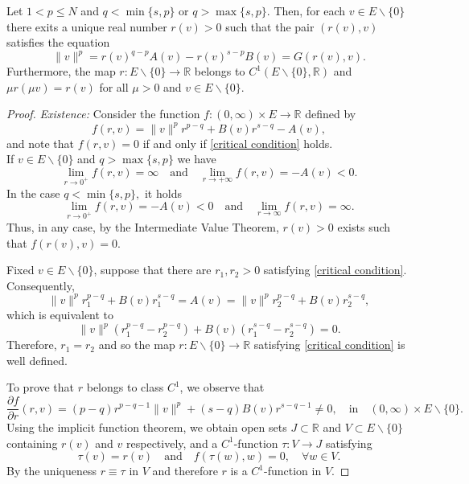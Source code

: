 \documentclass[10pt,a4paper]{amsart}
\begin{document}
\begin{lemma}\label{existence of a function r C1}Let $1<p\leq N$ and $q<\min\{s,p\}$ or $q>\max\{s,p\}$. Then, for each $v \in E\backslash\{0\}$ there exits a unique real number $r(v)>0$ such that the pair $(r(v),v)$ satisfies the equation 
  \begin{equation}\label{critical condition}
		\|v\|^p=r(v)^{q-p}A(v)-r(v)^{s-p}B(v)=G(r(v),v).
	\end{equation}
 Furthermore, the map $r:E\backslash\{0\}\rightarrow \mathds{R}$ belongs to $C^1(E\backslash\{0\},\mathds{R})$ and $\mu r(\mu v)=r(v)$ for all $\mu >0$ and $v \in E\backslash\{0\}$.
\end{lemma}

\begin{proof} {\it Existence:}
Consider the function $f:(0,\infty)\times E\rightarrow \mathds{R}$ defined by 
	\begin{equation*}
		f(r,v)=\|v\|^pr^{p-q}+B(v)r^{s-q}-A(v),
	\end{equation*} 	
and note that $f(r,v)=0$ if and only if \eqref{critical condition} holds. \\
If $v \in E\backslash\{0\}$ and $q>\max\{s,p\}$ we have
 \[
	\lim_{r\rightarrow 0^+}f(r,v)=\infty\quad \text{and}\quad \lim_{r \rightarrow +\infty}f(r,v)=-A(v)<0 .
\] 
In the case  $q<\min\{s,p\},$ it holds
 \[
\lim_{r \rightarrow 0^+}f(r,v)=-A(v)<0\quad \text{and}\quad 	\lim_{r\rightarrow \infty}f(r,v)=\infty.
	\]
Thus, in any case, by the Intermediate Value Theorem, $r(v)>0$ exists such that $f(r(v),v)=0$. 


Fixed $v \in E\backslash\{0\}$,  suppose that there are $r_1,r_2>0$ satisfying  \eqref{critical condition}. Consequently,  
\begin{equation*}
		\|v\|^pr_1^{p-q}+B(v)r_1^{s-q}=A(v)=\|v\|^pr_2^{p-q}+B(v)r_2^{s-q},
	\end{equation*}
which is equivalent to
	\begin{equation*}
		\|v\|^p(r_1^{p-q}-r_2^{p-q})+B(v)(r_1^{s-q}-r_2^{s-q})=0.
	\end{equation*}
Therefore, $r_1=r_2$ and so the map  $r:E\backslash\{0\}\rightarrow \mathds{R}$ satisfying  \eqref{critical condition} is well defined. 

 To prove that $r$ belongs to class $C^1$, we observe that  
	\begin{equation*}
		\frac{\partial f}{\partial r}(r,v)=(p-q)r^{p-q-1}\|v\|^p+(s-q)B(v)r^{s-q-1}\neq 0, \quad \text{in} \quad (0,\infty)\times E\backslash\{0\}.
	\end{equation*}
Using the implicit function theorem, 
 we obtain open sets $J \subset \mathds{R}$  and $V\subset E\backslash\{0\}$ containing $r(v)$ and $v$ respectively, and a $C^1$-function $\tau:V\rightarrow J$ satisfying 
	\[
	\tau(v)=r(v)\quad \text{and}\quad f(\tau(w),w)=0, \quad\forall w \in V.
	\]
By the uniqueness $r\equiv\tau$ in $V$ and therefore $r$ is a $C^1$-function in $V$. 
	

\end{proof}
\end{document}
